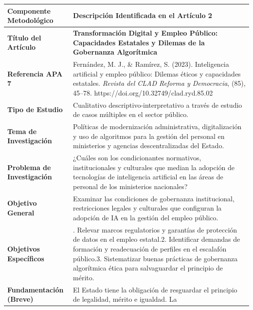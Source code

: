 \documentclass[
  spanish,
  letterpaper,
  DIV=11,
  numbers=noendperiod]{scrartcl}
\newcounter{none} %
\begin{document}
{\def\LTcaptype{none} %
\begin{longtable}[]{@{}
  >{\raggedright\arraybackslash}p{}
  >{\raggedright\arraybackslash}p{}@{}}
\toprule\noalign{}
\begin{minipage}[b]{\linewidth}\raggedright
Componente Metodológico
\end{minipage} & \begin{minipage}[b]{\linewidth}\raggedright
Descripción Identificada en el Artículo 2
\end{minipage} \\
\midrule\noalign{}
\endhead
\bottomrule\noalign{}
\endlastfoot
\textbf{Título del Artículo} & \textbf{Transformación Digital y Empleo
Público: Capacidades Estatales y Dilemas de la Gobernanza
Algorítmica} \\
\textbf{Referencia APA 7} & Fernández, M. J., \& Ramírez, S. (2023).
Inteligencia artificial y empleo público: Dilemas éticos y capacidades
estatales. \emph{Revista del CLAD Reforma y Democracia}, (85), 45--78.
https://doi.org/10.32749/clad.ryd.85.02 \\
\textbf{Tipo de Estudio} & Cualitativo descriptivo-interpretativo a
través de estudio de casos múltiples en el sector público. \\
\textbf{Tema de Investigación} & Políticas de modernización
administrativa, digitalización y uso de algoritmos para la gestión del
personal en ministerios y agencias descentralizadas del Estado. \\
\textbf{Problema de Investigación} & ¿Cuáles son los condicionantes
normativos, institucionales y culturales que median la adopción de
tecnologías de inteligencia artificial en las áreas de personal de los
ministerios nacionales? \\
\textbf{Objetivo General} & Examinar las condiciones de gobernanza
institucional, restricciones legales y culturales que configuran la
adopción de IA en la gestión del empleo público. \\
\textbf{Objetivos Específicos} & 1. Relevar marcos regulatorios y
garantías de protección de datos en el empleo estatal.2. Identificar
demandas de formación y readecuación de perfiles en el escalafón
público.3. Sistematizar buenas prácticas de gobernanza algorítmica ética
para salvaguardar el principio de mérito. \\
\textbf{Fundamentación (Breve)} & El Estado tiene la obligación de
resguardar el principio de legalidad, mérito e igualdad. La

\end{longtable}}
\end{document}

